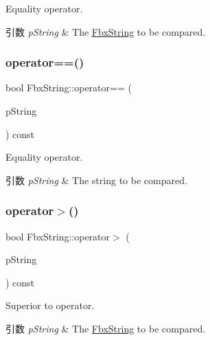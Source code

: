 Equality operator. 
\begin{DoxyParams}{引数}
{\em p\+String} & The \hyperlink{class_fbx_string}{Fbx\+String} to be compared. \\
\hline
\end{DoxyParams}
\mbox{\label{class_fbx_string_a292bdfc5c4bd13a7dd05c3660974f7d6}} 
\subsubsection{\texorpdfstring{operator==()}{operator==()}\hspace{0.1cm}{\footnotesize\ttfamily [2/2]}}
{\footnotesize\ttfamily bool Fbx\+String\+::operator== (\begin{DoxyParamCaption}\item[{const char $\ast$}]{p\+String }\end{DoxyParamCaption}) const}

Equality operator. 
\begin{DoxyParams}{引数}
{\em p\+String} & The string to be compared. \\
\hline
\end{DoxyParams}
\mbox{\label{class_fbx_string_ae21fb26fd94ff4ba33d0fc181d26c807}} 
\subsubsection{\texorpdfstring{operator$>$()}{operator>()}\hspace{0.1cm}{\footnotesize\ttfamily [1/2]}}
{\footnotesize\ttfamily bool Fbx\+String\+::operator$>$ (\begin{DoxyParamCaption}\item[{const \hyperlink{class_fbx_string}{Fbx\+String} \&}]{p\+String }\end{DoxyParamCaption}) const}

Superior to operator. 
\begin{DoxyParams}{引数}
{\em p\+String} & The \hyperlink{class_fbx_string}{Fbx\+String} to be compared. \\
\hline
\end{DoxyParams}
\mbox{\label{class_fbx_string_a67a9187d6ea2ee056a2d1b6acac6ad03}} 
